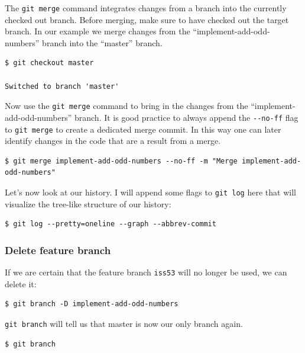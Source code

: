 \documentclass[11pt]{article}
\begin{document}
The \texttt{git\ merge} command integrates changes from a branch into
the currently checked out branch. Before merging, make sure to have
checked out the target branch. In our example we merge changes from the
``implement-add-odd-numbers'' branch into the ``master'' branch.

    \begin{verbatim}
$ git checkout master

Switched to branch 'master'
\end{verbatim}

    Now use the \texttt{git\ merge} command to bring in the changes from the
``implement-add-odd-numbers'' branch. It is good practice to always
append the \texttt{-\/-no-ff} flag to \texttt{git\ merge} to create a
dedicated merge commit. In this way one can later identify changes in
the code that are a result from a merge.

    \begin{verbatim}
$ git merge implement-add-odd-numbers --no-ff -m "Merge implement-add-odd-numbers"
\end{verbatim}

    Let's now look at our history. I will append some flags to
\texttt{git\ log} here that will visualize the tree-like structure of
our history:

    \begin{verbatim}
$ git log --pretty=oneline --graph --abbrev-commit
\end{verbatim}

    \hypertarget{delete-feature-branch}{%
\subsubsection{Delete feature branch}\label{delete-feature-branch}}

If we are certain that the feature branch \texttt{iss53} will no longer
be used, we can delete it:

    \begin{verbatim}
$ git branch -D implement-add-odd-numbers
\end{verbatim}

    \texttt{git\ branch} will tell us that master is now our only branch
again.

    \begin{verbatim}
$ git branch
\end{verbatim}


    
    
    
\end{document}
